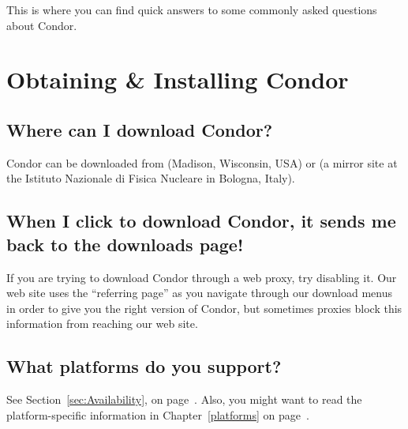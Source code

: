 

This is where you can find quick answers to some commonly asked
questions about Condor.

\section{Obtaining \& Installing Condor}

\subsection*{Where can I download Condor?}

Condor can be downloaded from
 (Madison, Wisconsin,
USA) or  (a mirror
site at the Istituto Nazionale di Fisica Nucleare in Bologna, Italy).

\subsection*{When I click to download Condor, it sends me back to the downloads page!}

If you are trying to download Condor through a web proxy, try
disabling it.
Our web site uses the ``referring page'' as you navigate through our
download menus in order to give you the right version of Condor, but
sometimes proxies block this information from reaching our web site.

\subsection*{What platforms do you support?}

See Section~\ref{sec:Availability}, on
page~\pageref{sec:Availability}.
Also, you might want to read the platform-specific information in
Chapter~\ref{platforms} on page~\pageref{platforms}.

